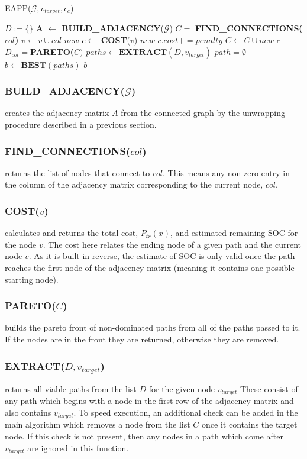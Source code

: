 \documentclass[journal]{IEEEtran}
\begin{document}
\textsc{EAPP}($\mathcal{G}, v_{target}, \epsilon_c$)
\begin{algorithmic}[1]
\STATE $D:=\{\}$ 
\STATE \textbf{A} $\leftarrow$ \textbf{BUILD\_ADJACENCY}($\mathcal{G}$)
\STATE $C =$ \textbf{FIND\_CONNECTIONS($col$)}
\STATE $v  \leftarrow v \cup col$ 
\STATE $new\_c \leftarrow$ \textbf{COST}($v$)
\STATE $new\_c.cost += penalty $ 
\ENDIF
\STATE $C \leftarrow C \cup new\_c$ 
\STATE $D_{col} = $\textbf{PARETO($C)$}
\ENDFOR
\ENDFOR
\STATE $paths \leftarrow \textbf{EXTRACT}(D, v_{target})$
\STATE $path = \emptyset$
\ENDIF
\ENDFOR
\STATE $b \leftarrow \textbf{BEST}(paths)$
\RETURN $b$
\end{algorithmic}

\subsubsection{BUILD\_ADJACENCY($\mathcal{G}$)} creates the adjacency matrix $A$ from the connected graph by the unwrapping procedure described in a previous section.
\subsubsection{FIND\_CONNECTIONS($col$)} returns the list of nodes that connect to $col$. This means any non-zero entry in the column of the adjacency matrix corresponding to the current node, $col$.
\subsubsection{COST($v$)} calculates and returns the total cost, $P_{tr}(x)$, and estimated remaining SOC for the node $v$. The cost here relates the ending node of a given path and the current node $v$. As it is built in reverse, the estimate of SOC is only valid once the path reaches the first node of the adjacency matrix (meaning it contains one possible starting node).
\subsubsection{PARETO($C$)} builds the pareto front of non-dominated paths from all of the paths passed to it. If the nodes are in the front they are returned, otherwise they are removed.
\subsubsection{EXTRACT($D, v_{target}$)} returns all viable paths from the list $D$ for the given node $v_{target}$
These consist of any path which begins with a node in the first row of the adjacency matrix and also contains $v_{target}$. 
To speed execution, an additional check can be added in the main algorithm which removes a node from the list $C$ once it contains the target node. 
If this check is not present, then any nodes in a path which come after $v_{target}$ are ignored in this function.
\end{document}
